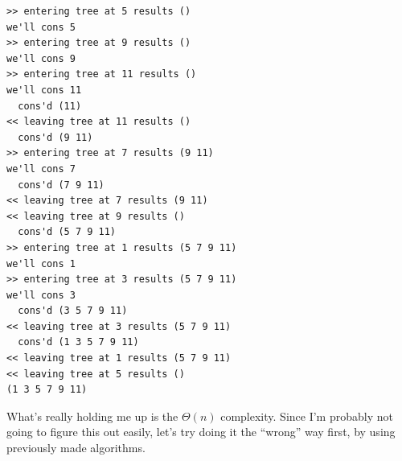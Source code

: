 \documentclass[final,fleqn,titlepage,twoside]{article}
\begin{document}
\begin{verbatim}
>> entering tree at 5 results ()
we'll cons 5
>> entering tree at 9 results ()
we'll cons 9
>> entering tree at 11 results ()
we'll cons 11
  cons'd (11)
<< leaving tree at 11 results ()
  cons'd (9 11)
>> entering tree at 7 results (9 11)
we'll cons 7
  cons'd (7 9 11)
<< leaving tree at 7 results (9 11)
<< leaving tree at 9 results ()
  cons'd (5 7 9 11)
>> entering tree at 1 results (5 7 9 11)
we'll cons 1
>> entering tree at 3 results (5 7 9 11)
we'll cons 3
  cons'd (3 5 7 9 11)
<< leaving tree at 3 results (5 7 9 11)
  cons'd (1 3 5 7 9 11)
<< leaving tree at 1 results (5 7 9 11)
<< leaving tree at 5 results ()
(1 3 5 7 9 11)
\end{verbatim}

What's really holding me up is the \(\Theta(n)\) complexity. Since I'm probably
not going to figure this out easily, let's try doing it the ``wrong'' way first,
by using previously made algorithms.
\end{document}
